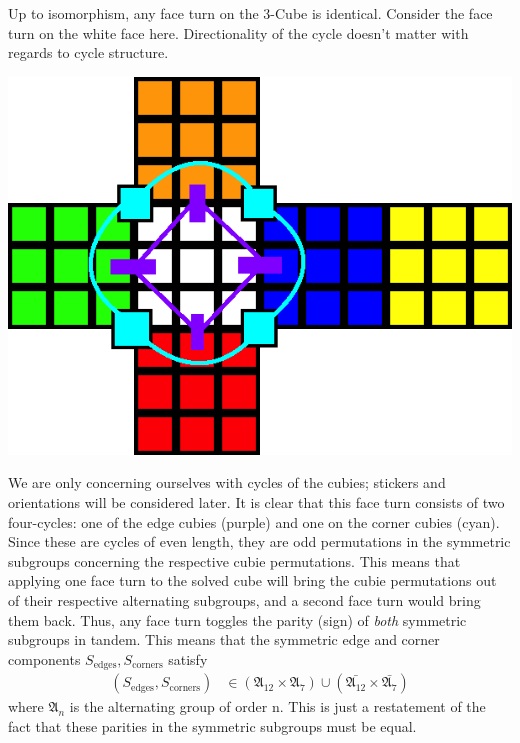 \documentclass[10pt,letterpaper]{report}
\begin{document}
Up to isomorphism, any face turn on the 3-Cube is identical.  Consider the face turn on the white face here.  Directionality of the cycle doesn't matter with regards to cycle structure.

\begin{center}
\includegraphics[scale=.5]{images/faceCubieCycle.png} 
\end{center}

We are only concerning ourselves with cycles of the cubies; stickers and orientations will be considered later.  It is clear that this face turn consists of two four-cycles: one of the edge cubies (purple) and one on the corner cubies (cyan).  Since these are cycles of even length, they are odd permutations in the symmetric subgroups concerning the respective cubie permutations.  This means that applying one face turn to the solved cube will bring the cubie permutations out of their respective alternating subgroups, and a second face turn would bring them back.  Thus, any face turn toggles the parity (sign) of \textit{both} symmetric subgroups in tandem.  This means that the symmetric edge and corner components $S_{\text{edges}}, S_{\text{corners}}$ satisfy
\begin{align*}
(S_{\text{edges}},S_{\text{corners}})
&\in
(\mathfrak{A}_{12} \times \mathfrak{A}_7)
\cup
(\bar{\mathfrak{A}_{12}} \times \bar{\mathfrak{A}_7})
\end{align*}
where $\mathfrak{A}_n$ is the alternating group of order n.  This is just a restatement of the fact that these parities in the symmetric subgroups must be equal. \\
\end{document}
